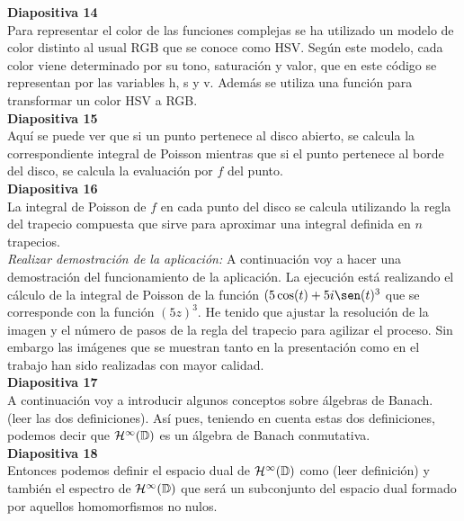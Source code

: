\documentclass[spanish, a4paper, 12pt]{article}
\begin{document}
\textbf{Diapositiva 14} \\

Para representar el color de las funciones complejas se ha utilizado un modelo de color distinto al usual RGB que se conoce como HSV. Según este modelo, cada color viene determinado por su tono, saturación y valor, que en este código se representan por las variables h, s y v. Además se utiliza una función para transformar un color HSV a RGB. \\

\textbf{Diapositiva 15} \\

Aquí se puede ver que si un punto pertenece al disco abierto, se calcula la correspondiente integral de Poisson mientras que si el punto pertenece al borde del disco, se calcula la evaluación por $f$ del punto. \\

\textbf{Diapositiva 16} \\

La integral de Poisson de $f$ en cada punto del disco se calcula utilizando la regla del trapecio compuesta que sirve para aproximar una integral definida en $n$ trapecios. \\

\textit{Realizar demostración de la aplicación:} A continuación voy a hacer una demostración del funcionamiento de la aplicación. La ejecución está realizando el cálculo de la integral de Poisson de la función $(5 \cos(t) + 5 i \sen(t)^3$ que se corresponde con la función $(5z)^3$. He tenido que ajustar la resolución de la imagen y el número de pasos de la regla del trapecio para agilizar el proceso. Sin embargo las imágenes que se muestran tanto en la presentación como en el trabajo han sido realizadas con mayor calidad. \\

\textbf{Diapositiva 17} \\

A continuación voy a introducir algunos conceptos sobre álgebras de Banach. (leer las dos definiciones). Así pues, teniendo en cuenta estas dos definiciones, podemos decir que $\mathcal{H}^{\infty}(\mathbb{D})$ es un álgebra de Banach conmutativa. \\

\textbf{Diapositiva 18} \\

Entonces podemos definir el espacio dual de $\mathcal{H}^{\infty}(\mathbb{D})$ como (leer definición) y también el espectro de  $\mathcal{H}^{\infty}(\mathbb{D})$ que será un subconjunto del espacio dual formado por aquellos homomorfismos no nulos. \\
\end{document}
